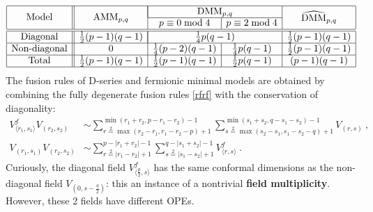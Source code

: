\documentclass[12pt, a4paper]{article}
\newcommand{\myindex}[1]{\textbf{\boldmath #1}}
\theoremstyle{break}
\begin{document}
\begin{align}
 \begin{array}{|c||c|c|c|c|}
 \hline 
  \multirow{2}{*}{Model} & \multirow{2}{*}{AMM$_{p,q}$} & \multicolumn{2}{|c|}{\text{DMM}_{p,q}} 
   & \multirow{2}{*}{$\widehat{\text{DMM}}_{p,q}$}
  \\
  \cline{3-4}
  & & p\equiv 0\bmod 4 & p\equiv 2\bmod 4 & 
  \\
  \hline \hline 
  \text{Diagonal} & \frac12(p-1)(q-1) & \multicolumn{2}{|c|}{\frac14 p(q-1)} & \frac12 (p-1)(q-1) 
  \\
  \hline 
  \text{Non-diagonal} & 0  & \frac14(p-2)(q-1) &
  \frac14p(q-1) 
  & \frac12 (p-1)(q-1) 
  \\
  \hline 
  \text{Total} & \frac12(p-1)(q-1) & 
   \frac12(p-1)(q-1) &
  \frac12 p(q-1) & (p-1)(q-1)
  \\
  \hline 
 \end{array}
\end{align}
The fusion rules of D-series and fermionic minimal models are obtained by combining the fully degenerate fusion rules \eqref{rfrf} with the conservation of diagonality:
\begin{subequations}
\begin{align}
 V^f_{\langle r_1,s_1\rangle}V_{(r_2,s_2)} &\sim \sum_{r\overset{2}{=}\max(r_2-r_1,r_1-r_2-p)+1}^{\min(r_1+r_2,p-r_1-r_2)-1} \sum_{s\overset{2}{=}\max(s_2-s_1,s_1-s_2-q)+1}^{\min(s_1+s_2,q-s_1-s_2)-1} V_{(r,s)} \ ,
 \label{vfvn}
 \\
 V_{(r_1,s_1)} V_{(r_2,s_2)} & \sim \sum_{r\overset{2}{=}|r_1-r_2|+1}^{p-|r_1+r_2|-1} \sum_{s\overset{2}{=}|s_1-s_2|+1}^{q-|s_1+s_2|-1} V^f_{\langle r,s\rangle}\ . 
 \label{vnvn}
\end{align}
\end{subequations}
Curiously, the diagonal field $V^f_{\langle \frac{p}{2}, s\rangle}$ has the same conformal dimensions as the non-diagonal field $V_{(0,s-\frac{q}{2})}$: this an instance of a nontrivial \myindex{field multiplicity}. However, these 2 fields have different OPEs. 
\end{document}
